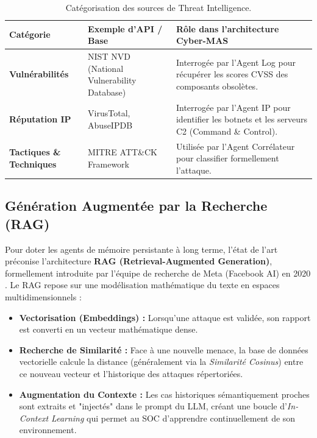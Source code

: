 \documentclass[a4paper, 12pt]{report}
\begin{document}
\begin{table}[htbp]
\centering
\caption[Catégorisation des sources de Threat Intelligence]{Catégorisation des sources de Threat Intelligence.}
\label{tab:sources_cti}
\vspace{0.2cm}
\begin{tabular}{|l|>{\raggedright\arraybackslash}p{5cm}|>{\raggedright\arraybackslash}p{5cm}|}
\hline
\textbf{Catégorie} & \textbf{Exemple d'API / Base} & \textbf{Rôle dans l'architecture Cyber-MAS} \\ \hline
\textbf{Vulnérabilités} & NIST NVD (National Vulnerability Database) & Interrogée par l'Agent Log pour récupérer les scores CVSS des composants obsolètes. \\ \hline
\textbf{Réputation IP} & VirusTotal, AbuseIPDB & Interrogée par l'Agent IP pour identifier les botnets et les serveurs C2 (Command \& Control). \\ \hline
\textbf{Tactiques \& Techniques} & MITRE ATT\&CK Framework & Utilisée par l'Agent Corrélateur pour classifier formellement l'attaque. \\ \hline
\end{tabular}
\end{table}

\subsection{Génération Augmentée par la Recherche (RAG)}
Pour doter les agents de mémoire persistante à long terme, l'état de l'art préconise l'architecture \textbf{RAG (Retrieval-Augmented Generation)}, formellement introduite par l'équipe de recherche de Meta (Facebook AI) en 2020 \cite{lewis_rag}.
Le RAG repose sur une modélisation mathématique du texte en espaces multidimensionnels :
\begin{itemize}
    \item \textbf{Vectorisation (Embeddings) :} Lorsqu'une attaque est validée, son rapport est converti en un vecteur mathématique dense.
    \item \textbf{Recherche de Similarité :} Face à une nouvelle menace, la base de données vectorielle calcule la distance (généralement via la \textit{Similarité Cosinus}) entre ce nouveau vecteur et l'historique des attaques répertoriées.
    \item \textbf{Augmentation du Contexte :} Les cas historiques sémantiquement proches sont extraits et "injectés" dans le prompt du LLM, créant une boucle d'\textit{In-Context Learning} qui permet au SOC d'apprendre continuellement de son environnement.
\end{itemize}
\end{document}
